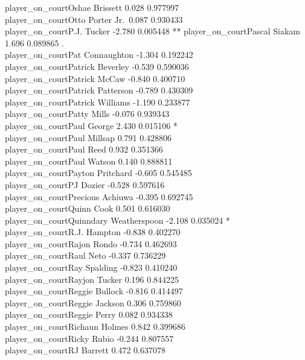 \documentclass[
  landscape]{article}
\begin{document}
player\_on\_courtOshae Brissett 0.028 0.977997\\
player\_on\_courtOtto Porter Jr.~0.087 0.930433\\
player\_on\_courtP.J. Tucker -2.780 0.005448 ** player\_on\_courtPascal
Siakam 1.696 0.089865 .\\
player\_on\_courtPat Connaughton -1.304 0.192242\\
player\_on\_courtPatrick Beverley -0.539 0.590036\\
player\_on\_courtPatrick McCaw -0.840 0.400710\\
player\_on\_courtPatrick Patterson -0.789 0.430309\\
player\_on\_courtPatrick Williams -1.190 0.233877\\
player\_on\_courtPatty Mills -0.076 0.939343\\
player\_on\_courtPaul George 2.430 0.015106 *\\
player\_on\_courtPaul Millsap 0.791 0.428806\\
player\_on\_courtPaul Reed 0.932 0.351366\\
player\_on\_courtPaul Watson 0.140 0.888811\\
player\_on\_courtPayton Pritchard -0.605 0.545485\\
player\_on\_courtPJ Dozier -0.528 0.597616\\
player\_on\_courtPrecious Achiuwa -0.395 0.692745\\
player\_on\_courtQuinn Cook 0.501 0.616030\\
player\_on\_courtQuinndary Weatherspoon -2.108 0.035024 *\\
player\_on\_courtR.J. Hampton -0.838 0.402270\\
player\_on\_courtRajon Rondo -0.734 0.462693\\
player\_on\_courtRaul Neto -0.337 0.736229\\
player\_on\_courtRay Spalding -0.823 0.410240\\
player\_on\_courtRayjon Tucker 0.196 0.844225\\
player\_on\_courtReggie Bullock -0.816 0.414497\\
player\_on\_courtReggie Jackson 0.306 0.759860\\
player\_on\_courtReggie Perry 0.082 0.934338\\
player\_on\_courtRichaun Holmes 0.842 0.399686\\
player\_on\_courtRicky Rubio -0.244 0.807557\\
player\_on\_courtRJ Barrett 0.472 0.637078\\
\end{document}
